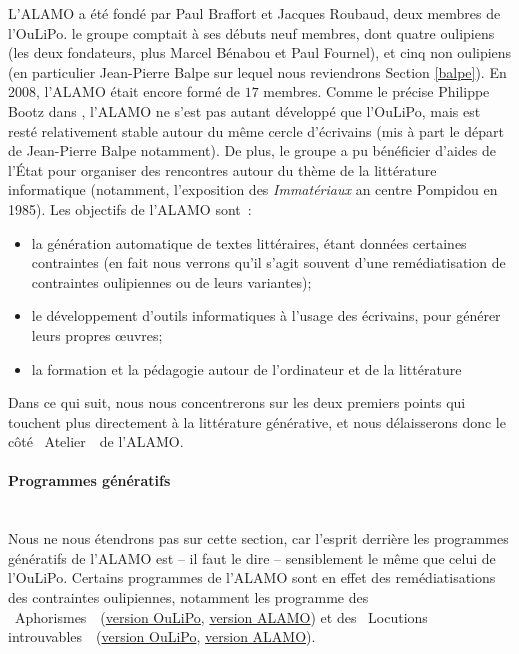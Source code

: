 \documentclass{article}
\newcommand{\subsubsubsection}[1]{\paragraph{#1}\mbox{}\\}
\begin{document}
				L'ALAMO a été fondé par Paul Braffort et Jacques Roubaud, deux membres de l'OuLiPo. le groupe comptait à ses débuts neuf membres, dont quatre oulipiens (les deux fondateurs, plus Marcel Bénabou et Paul Fournel), et cinq non oulipiens (en particulier Jean-Pierre Balpe sur lequel nous reviendrons Section \ref{balpe}). En 2008, l'ALAMO était encore formé de $17$ membres. Comme le précise Philippe Bootz dans \autocite{bootz2012}, l'ALAMO ne s'est pas autant développé que l'OuLiPo, mais est resté relativement stable autour du même cercle d'écrivains (mis à part le départ de Jean-Pierre Balpe notamment). De plus, le groupe a pu bénéficier d'aides de l'État pour organiser des rencontres autour du thème de la littérature informatique (notamment, l'exposition des \textit{Immatériaux} an centre Pompidou en 1985). Les objectifs de l'ALAMO \autocite{alamo} sont~:
				\vspace{2mm}
				\begin{itemize}
					\item la génération automatique de textes littéraires, étant données certaines contraintes (en fait nous verrons qu'il s'agit souvent d'une remédiatisation de contraintes oulipiennes ou de leurs variantes);
					\item le développement d'outils informatiques à l'usage des écrivains, pour générer leurs propres œuvres;
					\item la formation et la pédagogie autour de l'ordinateur et de la littérature
				\end{itemize}
				\vspace{2mm}
				Dans ce qui suit, nous nous concentrerons sur les deux premiers points qui touchent plus directement à la littérature générative, et nous délaisserons donc le côté \guillemotleft~Atelier~\guillemotright~de l'ALAMO.
				\subsubsubsection{Programmes génératifs}
					Nous ne nous étendrons pas sur cette section, car l'esprit derrière les programmes génératifs de l'ALAMO est -- il faut le dire -- sensiblement le même que celui de l'OuLiPo. Certains programmes de l'ALAMO sont en effet des remédiatisations des contraintes oulipiennes, notamment les programme des \guillemotleft~Aphorismes~\guillemotright~(\href{http://oulipo.net/fr/contraintes/aphorisme}{version OuLiPo}, \href{http://www.alamo.free.fr/pmwiki.php?n=Programmes.Aphorismes}{version ALAMO}) et des \guillemotleft~Locutions introuvables~\guillemotright~(\href{http://oulipo.net/fr/contraintes/locutions-introuvables}{version OuLiPo}, \href{http://www.alamo.free.fr/pmwiki.php?n=Programmes.LocutionsIntrouvables}{version ALAMO}).\\
\end{document}
